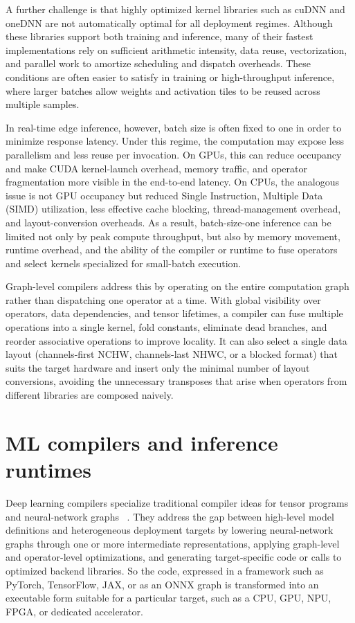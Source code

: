 \documentclass[12pt,a4paper]{report}
\begin{document}
A further challenge is that highly optimized kernel libraries such as cuDNN and oneDNN are not
automatically optimal for all deployment regimes. Although these libraries support both training and
inference, many of their fastest implementations rely on sufficient arithmetic intensity, data reuse,
vectorization, and parallel work to amortize scheduling and dispatch overheads. These conditions are
often easier to satisfy in training or high-throughput inference, where larger batches allow weights and
activation tiles to be reused across multiple samples.

In real-time edge inference, however, batch size is often fixed to one in order to minimize response
latency. Under this regime, the computation may expose less parallelism and less reuse per invocation.
On GPUs, this can reduce occupancy and make CUDA kernel-launch overhead, memory traffic, and
operator fragmentation more visible in the end-to-end latency. On CPUs, the analogous issue is not GPU
occupancy but reduced Single Instruction, Multiple Data (SIMD) utilization, less effective cache blocking, thread-management overhead,
and layout-conversion overheads. As a result, batch-size-one inference can be limited not only by peak
compute throughput, but also by memory movement, runtime overhead, and the ability of the compiler or
runtime to fuse operators and select kernels specialized for small-batch execution.

Graph-level compilers address this by operating on the entire computation graph rather than dispatching one
operator at a time. With global visibility over operators, data dependencies, and tensor lifetimes,
a compiler can fuse multiple operations into a single kernel, fold constants, eliminate dead branches, and
reorder associative operations to improve locality. It can also select a single data layout (channels-first NCHW, channels-last NHWC, or
a blocked format) that suits the target hardware and insert only the minimal number of layout conversions,
avoiding the unnecessary transposes that arise when operators from different libraries are composed naively.


\section{ML compilers and inference runtimes}

Deep learning compilers specialize traditional compiler ideas for tensor programs and neural-network graphs
~\cite{li2020deep, zhang2023compiler, thangamani2024survey, zhang2026new}.
They address the gap between high-level model definitions and heterogeneous deployment targets
by lowering neural-network graphs through one or more intermediate representations, applying graph-level and
operator-level optimizations, and generating target-specific code or calls to optimized backend libraries.
So the code, expressed in a framework such as PyTorch, TensorFlow, JAX, or
as an ONNX graph is transformed into an executable form suitable for a particular target, such as a CPU,
GPU, NPU, FPGA, or dedicated accelerator.
\end{document}
